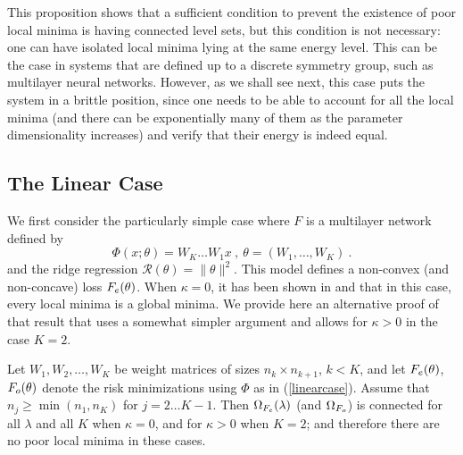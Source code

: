 This proposition shows that a sufficient condition to prevent the existence of poor local minima is having connected level sets, but this condition is not necessary: one can have isolated local minima lying 
at the same energy level. This can be the case in systems that are defined up to 
a discrete symmetry group, such as multilayer neural networks. However, as we shall see next, this case puts the system in a brittle position, since one needs to be able to account for all the local minima (and there can be exponentially many of them as the parameter dimensionality increases) and verify that their energy is indeed equal. 

\subsection{The Linear Case}

We first consider the 
particularly simple case where 
$F$ is a multilayer network defined by
\begin{equation}
\label{linearcase}
\Phi(x;\theta) = W_K \dots W_1 x~,~\theta = (W_1, \dots, W_K)~.
\end{equation}
and the ridge regression $\mathcal{R}(\theta) =\| \theta \|^2$. This model defines a non-convex (and non-concave) loss $F_{e}(\theta)$.
When $\kappa = 0$, it has been shown in \cite{saxe2013exact} and \cite{kawaguchi2016deep} that in this case, 
every local minima is a global minima.  
We provide here an alternative proof of that result that uses
a somewhat simpler argument and allows for $\kappa > 0$ in the case $K=2$.


\begin{proposition}
\label{proplinear}
Let $W_1, W_2, \dots, W_K$ be weight matrices of sizes 
$n_k \times n_{k+1}$, $k < K$, and let $F_{e}(\theta)$, $F_{o}(\theta)$ 
denote the risk minimizations using $\Phi$ as in (\ref{linearcase}). %
Assume that $n_j \geq \min(n_1, n_K)$ for $j=2 \dots K-1$.
Then $\Omega_{F_{e}}(\lambda)$ (and $\Omega_{F_{o}}$) is connected for all $\lambda$ and all $K$ when $\kappa=0$, and for $\kappa>0$ when $K=2$; 
and therefore there are no poor local minima in these cases. 
\end{proposition}

